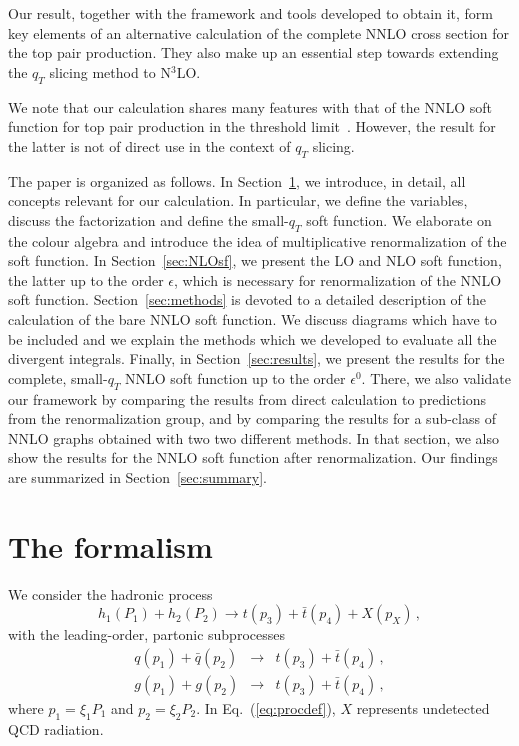 \documentclass[a4paper,11pt]{article}
\numberwithin{equation}{section}
\begin{document}
Our result, together with the framework and tools developed to obtain it, form
key  elements of an alternative calculation of the complete NNLO cross section
for the top pair production. They also make up an essential step towards
extending the $q_T$ slicing  method to N$^3$LO.

We note that our calculation
shares many features with that of the NNLO soft function for top pair production
in the threshold limit~\cite{Ferroglia:2012uy, Wang:2018vgu}. However, the
result for the latter is not of direct use in the context of $q_T$ slicing.

The paper is organized as follows. In Section~\ref{sec:formalism}, we introduce,
in detail, all concepts relevant for our calculation. In particular, we define
the variables, discuss the factorization and define the small-$q_T$ soft
function. We elaborate on the colour algebra and introduce the idea of
multiplicative renormalization of the soft function. In Section~\ref{sec:NLOsf},
we present the LO and NLO soft function, the latter up to the order $\epsilon$,
which is necessary for renormalization of the NNLO soft function.
%
Section~\ref{sec:methods} is devoted to a detailed description of the
calculation of the bare NNLO soft function. We discuss diagrams which
have to be included and we explain the methods which we developed to evaluate
all the divergent integrals. Finally, in Section~\ref{sec:results}, we present
the results for the complete, small-$q_T$ NNLO soft function up to the order
$\epsilon^0$. 
%
There, we also validate our framework by comparing the results from direct
calculation to predictions from the renormalization group, and by comparing
the results for a sub-class of NNLO graphs obtained with two two different
methods.
%
In that section, we also show the results for the NNLO soft function after
renormalization.
%
Our findings are summarized in Section~\ref{sec:summary}.


\section{The formalism}
\label{sec:formalism}

We consider the hadronic process
%
\begin{equation}
  h_1(P_1) + h_2(P_2) \to t(p_3) + \bar t(p_4) + X(p_X)\,,
  \label{eq:procdef}
\end{equation}
%
with the leading-order, partonic subprocesses
%
\begin{eqnarray}
  q(p_1) + \bar q(p_2) & \to & t(p_3) + \bar t(p_4)\,, \\
  g(p_1) + g(p_2)      & \to & t(p_3) + \bar t(p_4)\,,
\end{eqnarray}
%
where $p_1 = \xi_1 P_1$ and $p_2 = \xi_2 P_2$.
%
In Eq.~(\ref{eq:procdef}), $X$ represents undetected QCD radiation.
\end{document}

